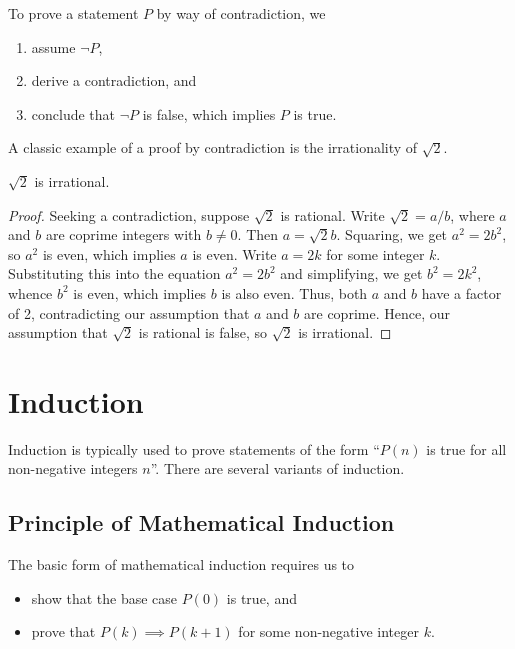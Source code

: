 \begin{recipe}
    To prove a statement $P$ by way of contradiction, we
    \begin{enumerate}
        \item assume $\lnot P$,
        \item derive a contradiction, and
        \item conclude that $\lnot P$ is false, which implies $P$ is true.
    \end{enumerate}
\end{recipe}

A classic example of a proof by contradiction is the irrationality of $\sqrt 2$.

\begin{statement}
    $\sqrt2$ is irrational.
\end{statement}
\begin{proof}
    Seeking a contradiction, suppose $\sqrt2$ is rational. Write $\sqrt2 = a/b$, where $a$ and $b$ are coprime integers with $b \neq 0$. Then $a = \sqrt{2}b$. Squaring, we get $a^2 = 2b^2$, so $a^2$ is even, which implies $a$ is even. Write $a = 2k$ for some integer $k$. Substituting this into the equation $a^2 = 2b^2$ and simplifying, we get $b^2 = 2k^2$, whence $b^2$ is even, which implies $b$ is also even. Thus, both $a$ and $b$ have a factor of 2, contradicting our assumption that $a$ and $b$ are coprime. Hence, our assumption that $\sqrt2$ is rational is false, so $\sqrt2$ is irrational.
\end{proof}

\section{Induction}

Induction is typically used to prove statements of the form ``$P(n)$ is true for all non-negative integers $n$''. There are several variants of induction.

\subsection{Principle of Mathematical Induction}

The basic form of mathematical induction requires us to
\begin{itemize}
    \item show that the base case $P(0)$ is true, and
    \item prove that $P(k) \implies P(k+1)$ for some non-negative integer $k$.
\end{itemize}

